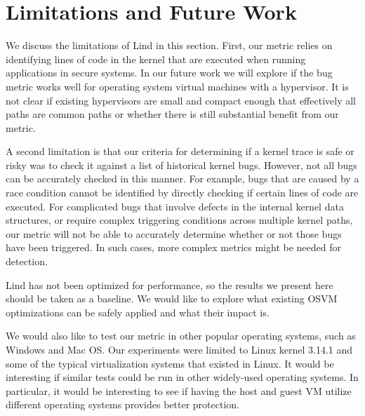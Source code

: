 \section{Limitations and Future Work}
\label{sec.limitation}

We discuss the limitations of Lind in this section. 
First, our metric relies on identifying lines of
code in the kernel that are executed when running applications in secure
systems. In our future work we will explore if the bug metric works well for
operating system virtual machines with a hypervisor.  It is not clear if
existing hypervisors are small and compact enough that effectively all paths
are common paths or whether there is still substantial benefit from our metric.

A second limitation is that our criteria for determining if a kernel trace is
safe or risky was to  check it against a list of historical kernel bugs.
However, not all bugs can be accurately checked in this manner. For
example, bugs that are caused by a race condition cannot be identified by
directly checking if certain lines of code are executed. For complicated
bugs that involve defects in the internal kernel data structures, or
require complex triggering conditions across multiple kernel paths, our
metric will not be able to accurately determine whether or not those bugs
have been triggered. In such cases, more complex metrics might be needed
for detection.  

Lind has not been optimized for performance, so the
results we present here should be taken as a baseline. 
We would like to explore what existing OSVM optimizations can be safely
applied and what their impact is.


We would also like to test our metric in other
popular operating systems, such as Windows and Mac OS. Our experiments were
limited to Linux kernel 3.14.1 and some of the typical virtualization
systems that existed in Linux. It would be interesting 
if similar tests could be
run in other widely-used operating systems.  In particular, it would
be interesting to see if having the host and guest VM utilize different
operating systems provides better protection.


